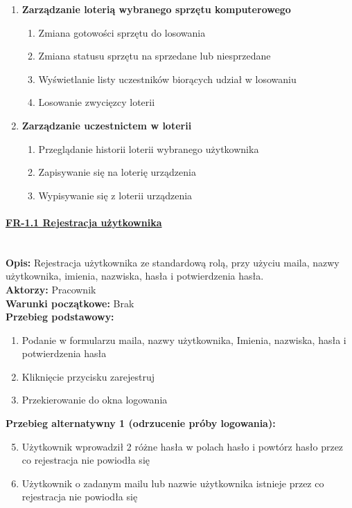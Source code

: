 \begin{enumerate}[label={\textbf{FR}-\bfseries\arabic*}]
		
		\item \textbf{Zarządzanie loterią wybranego sprzętu komputerowego}
		\begin{enumerate}[label={FR-\arabic{enumi}.\arabic*},noparskip]
        \item Zmiana gotowości sprzętu do losowania
        \item Zmiana statusu sprzętu na sprzedane lub niesprzedane
				\item Wyświetlanie listy uczestników biorących udział w losowaniu
        \item Losowanie zwycięzcy loterii
    \end{enumerate}
		
		\item \textbf{Zarządzanie uczestnictem w loterii}
			\begin{enumerate}[label={FR-\arabic{enumi}.\arabic*},noparskip]
        \item Przeglądanie historii loterii wybranego użytkownika
        \item Zapisywanie się na loterię urządzenia
				\item Wypisywanie się z loterii urządzenia
    \end{enumerate}
\end{enumerate}

\paragraph{\underline{FR-1.1 Rejestracja użytkownika}}\mbox{}\\[1mm]
	\noindent\textbf{Opis:} Rejestracja użytkownika ze standardową rolą, przy użyciu maila, nazwy użytkownika, imienia, nazwiska, hasła i potwierdzenia hasła.\\
	\noindent\textbf{Aktorzy:} Pracownik\\
	\textbf{Warunki początkowe:} Brak\\
	\textbf{Przebieg podstawowy:}
	\begin{enumerate}[noparskip]
		\item Podanie w formularzu maila, nazwy użytkownika, Imienia, nazwiska, hasła i potwierdzenia hasła
    \item Kliknięcie przycisku zarejestruj
		\item Przekierowanie do okna logowania
	\end{enumerate}
	\textbf{Przebieg alternatywny 1 (odrzucenie próby logowania):}
	\begin{enumerate}[noparskip]\setcounter{enumi}{4}
		\item Użytkownik wprowadził 2 różne hasła w polach hasło i powtórz hasło przez co rejestracja nie powiodła się
		\item Użytkownik o zadanym mailu lub nazwie użytkownika istnieje przez co rejestracja nie powiodła się
	\end{enumerate}	\mbox{}\\[-11mm]

